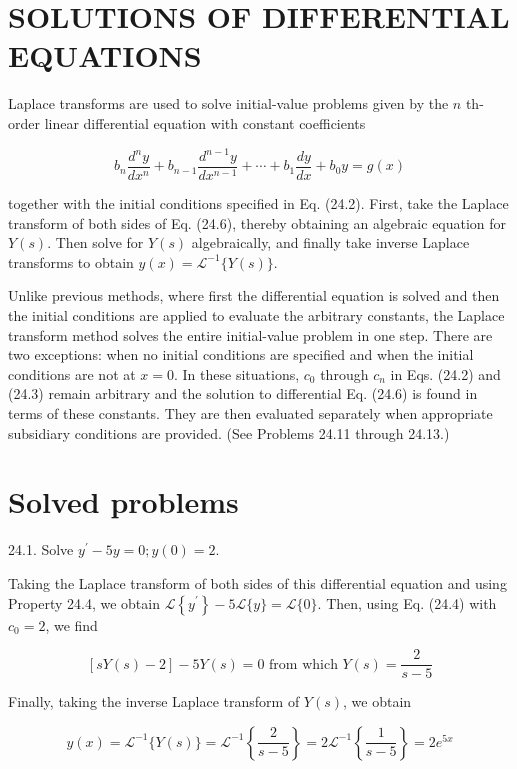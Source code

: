 \documentclass[10pt]{article}
\begin{document}
\section*{SOLUTIONS OF DIFFERENTIAL EQUATIONS}
Laplace transforms are used to solve initial-value problems given by the $n$ th-order linear differential equation with constant coefficients


\begin{equation*}
b_{n} \frac{d^{n} y}{d x^{n}}+b_{n-1} \frac{d^{n-1} y}{d x^{n-1}}+\cdots+b_{1} \frac{d y}{d x}+b_{0} y=g(x) \tag{24.6}
\end{equation*}


together with the initial conditions specified in Eq. (24.2). First, take the Laplace transform of both sides of Eq. (24.6), thereby obtaining an algebraic equation for $Y(s)$. Then solve for $Y(s)$ algebraically, and finally take inverse Laplace transforms to obtain $y(x)=\mathscr{L}^{-1}\{Y(s)\}$.

Unlike previous methods, where first the differential equation is solved and then the initial conditions are applied to evaluate the arbitrary constants, the Laplace transform method solves the entire initial-value problem in one step. There are two exceptions: when no initial conditions are specified and when the initial conditions are not at $x=0$. In these situations, $c_{0}$ through $c_{n}$ in Eqs. (24.2) and (24.3) remain arbitrary and the solution to differential Eq. (24.6) is found in terms of these constants. They are then evaluated separately when appropriate subsidiary conditions are provided. (See Problems 24.11 through 24.13.)

\section*{Solved problems}
24.1. Solve $y^{\prime}-5 y=0 ; y(0)=2$.

Taking the Laplace transform of both sides of this differential equation and using Property 24.4, we obtain $\mathscr{L}\left\{y^{\prime}\right\}-5 \mathscr{L}\{y\}=\mathscr{L}\{0\}$. Then, using Eq. (24.4) with $c_{0}=2$, we find

$$
[s Y(s)-2]-5 Y(s)=0 \text { from which } Y(s)=\frac{2}{s-5}
$$

Finally, taking the inverse Laplace transform of $Y(s)$, we obtain

$$
y(x)=\mathscr{L}^{-1}\{Y(s)\}=\mathscr{L}^{-1}\left\{\frac{2}{s-5}\right\}=2 \mathscr{L}^{-1}\left\{\frac{1}{s-5}\right\}=2 e^{5 x}
$$
\end{document}
